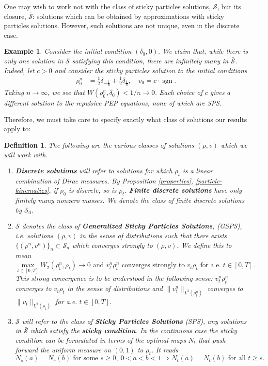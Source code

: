\documentclass[11pt]{article}
\newtheorem{definition}[theorem]{Definition}
\newtheorem{example}[theorem]{Example}
\numberwithin{equation}{section}
\DeclareMathOperator{\sgn}{sgn}
\begin{document}
        
        One may wish to work not with the class of sticky particles solutions, $\mathcal{S}$, but its closure, $\bar{\mathcal{S}}$: solutions which can be obtained by approximations with sticky particles solutions. However, such solutions are not unique, even in the discrete case. 
        \begin{example}
            Consider the initial condition $(\delta_0,0)$. We claim that, while there is only one solution in $\mathcal{S}$ satisfying this condition, there are infinitely many in $\bar{\mathcal{S}}$. Indeed, let $c>0$ and consider the sticky particles solution to the initial conditions 
            \begin{align*}
                \rho_0^n&=\frac{1}{2}\delta_{-\frac{1}{n}}+\frac{1}{2}\delta_\frac{1}{n}, \quad v_0=c\cdot\sgn. 
            \end{align*}
            Taking $n\to\infty$, we see that $W(\rho_0^n,\delta_0)<1/n\to0$. Each choice of $c$ gives a different solution to the repulsive PEP equations, none of which are SPS. 
        \end{example}
        Therefore, we must take care to specify exactly what class of solutions our results apply to:
        \begin{definition}
            The following are the various classes of solutions $(\rho,v)$ which we will work with. 
            \begin{enumerate}
                \item \textbf{Discrete solutions} will refer to solutions for which $\rho_t$ is a linear combination of Dirac measures. By Proposition \ref{properties}, \ref{particle-kinematics}, if $\rho_0$ is discrete, so is $\rho_t$. \textbf{Finite discrete solutions} have only finitely many nonzero masses.  We denote the class of finite discrete solutions by $\mathcal{S}_d$.
                \item $\bar{\mathcal{S}}$ denotes the class of \textbf{Generalized Sticky Particles Solutions}, (GSPS), i.e. solutions $(\rho,v)$ in the sense of distributions
                    such that there exists $\{(\rho^n,v^n)\}_n\subset\mathcal{S}_d$ which converges strongly to $(\rho,v)$. We define this to mean 
                    $$\max_{t\in[0,T]}W_2(\rho_t^n,\rho_t)\rightarrow 0\mbox{ and }v_t^n\rho_t^n\mbox{ converges strongly to }v_t\rho_t\mbox{ for a.e. }t\in[0,T].$$ 
                    This strong convergence is to be understood in the following sense: $v_t^n\rho_t^n$ converges to $v_t\rho_t$ in the sense of distributions and $\|v_t^n\|_{L^2(\rho^n_t)}$ converges to $\|v_t\|_{L^2(\rho_t)}$  for a.e. $t\in[0,T].$
                \item $\mathcal{S}$ will refer to the class of \textbf{Sticky Particles Solutions} (SPS), any solutions in $\bar{\mathcal{S}}$ which satisfy the \textbf{sticky condition}. In the continuous case the sticky condition can be formulated in terms of the optimal maps $N_t$ that push forward the uniform measure on $(0,1)$ to $\rho_t$. It reads
                    $$N_s(a)=N_s(b)\mbox{ for some }s\geq0,\ 0<a<b<1\Rightarrow N_t(a)=N_t(b)\mbox{ for all }t\geq s.$$
            \end{enumerate}
        \end{definition}
\end{document}
